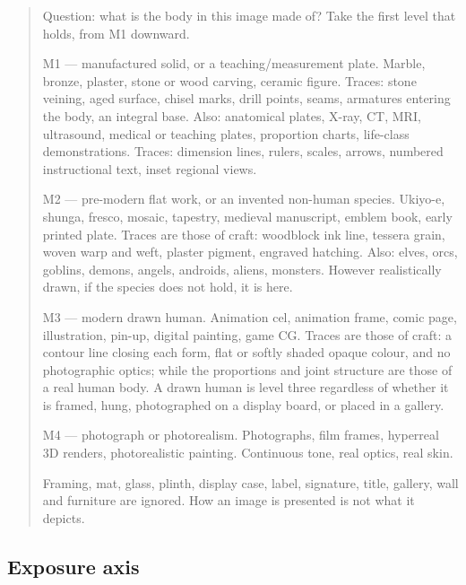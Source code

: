 \begin{quote}\small\ttfamily
Question: what is the body in this image made of? Take the first level that
holds, from M1 downward.

M1 --- manufactured solid, or a teaching/measurement plate. Marble, bronze,
plaster, stone or wood carving, ceramic figure. Traces: stone veining, aged
surface, chisel marks, drill points, seams, armatures entering the body, an
integral base. Also: anatomical plates, X-ray, CT, MRI, ultrasound, medical or
teaching plates, proportion charts, life-class demonstrations. Traces:
dimension lines, rulers, scales, arrows, numbered instructional text, inset
regional views.

M2 --- pre-modern flat work, or an invented non-human species. Ukiyo-e,
shunga, fresco, mosaic, tapestry, medieval manuscript, emblem book, early
printed plate. Traces are those of craft: woodblock ink line, tessera grain,
woven warp and weft, plaster pigment, engraved hatching. Also: elves, orcs,
goblins, demons, angels, androids, aliens, monsters. However realistically
drawn, if the species does not hold, it is here.

M3 --- modern drawn human. Animation cel, animation frame, comic page,
illustration, pin-up, digital painting, game CG. Traces are those of craft: a
contour line closing each form, flat or softly shaded opaque colour, and no
photographic optics; while the proportions and joint structure are those of a
real human body. A drawn human is level three regardless of whether it is
framed, hung, photographed on a display board, or placed in a gallery.

M4 --- photograph or photorealism. Photographs, film frames, hyperreal 3D
renders, photorealistic painting. Continuous tone, real optics, real skin.

Framing, mat, glass, plinth, display case, label, signature, title, gallery,
wall and furniture are ignored. How an image is presented is not what it
depicts.
\end{quote}

\subsection{Exposure axis}

